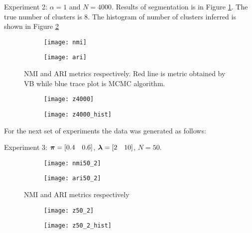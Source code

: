 \documentclass{article}
\begin{document}
Experiment 2: $\alpha=1$ and $N=4000$. Results of segmentation is in Figure \ref{fig:N4000}. The true number of clusters is 8. The histogram of number of clusters inferred is shown in Figure \ref{fig:z4000}
\begin{figure}[h]
\centering
\begin{subfigure}{0.4\textwidth}
\texttt{[image: nmi]}
\caption{}
\end{subfigure}
\begin{subfigure}{0.4\textwidth}
\texttt{[image: ari]}
\caption{}
\end{subfigure}
\caption{NMI and ARI metrics respectively. Red line is metric obtained by VB while blue trace plot is MCMC algorithm.}
\label{fig:N4000}
\end{figure}
\begin{figure}[h]
\centering
\begin{subfigure}{0.4\textwidth}
\texttt{[image: z4000]}
\caption{}
\end{subfigure}
\begin{subfigure}{0.4\textwidth}
\texttt{[image: z4000\_hist]}
\caption{}
\end{subfigure}
\caption{}
\label{fig:z4000}
\end{figure}

\clearpage
For the next set of experiments the data was generated as follows:
\begin{algorithm}
    \KwResult{$\cy$}
\end{algorithm}

Experiment 3: $\bm{\pi}=[0.4\quad 0.6]$, $\bm{\lambda}=[2\quad 10]$, $N=50$.
\begin{figure}[h]
\centering
\begin{subfigure}{0.4\textwidth}
\texttt{[image: nmi50\_2]}
\caption{}
\end{subfigure}
\begin{subfigure}{0.4\textwidth}
\texttt{[image: ari50\_2]}
\caption{}
\end{subfigure}
\caption{NMI and ARI metrics respectively}
\label{fig:N50}
\end{figure}
\begin{figure}[h]
\centering
\begin{subfigure}{0.4\textwidth}
\texttt{[image: z50\_2]}
\caption{}
\end{subfigure}
\begin{subfigure}{0.4\textwidth}
\texttt{[image: z50\_2\_hist]}
\caption{}
\end{subfigure}
\caption{}
\label{fig:z50}
\end{figure}
\end{document}
